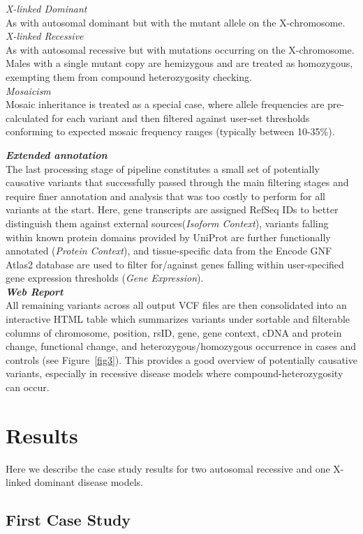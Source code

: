 \documentclass[twocolumn]{bmcart}%
\newcommand{\triplesub}[2]{\noindent\textsl{#1}\\#2\\}  %
\newcounter{changeCount}
\newcommand{\changes}[1]{
		\stepcounter{changeCount}
		{\tiny\bf\color{violet}\arabic{changeCount}}
		{\color{red} #1}
	}
\newcommand{\changes}[1]{#1}
\begin{document}
{{	\triplesub{X-linked Dominant}{As with autosomal dominant but with the mutant allele on the X-chromosome.}
	
	\triplesub{X-linked Recessive}{As with autosomal recessive but with mutations occurring on the X-chromosome. Males with a single mutant copy are hemizygous and are treated as homozygous, exempting them from compound heterozygosity checking.}
	
	\triplesub{Mosaicism}{Mosaic inheritance is treated as a special case, where allele frequencies are pre-calculated for each variant and then filtered against user-set thresholds conforming to expected mosaic frequency ranges (typically between 10-35\%).}
}

\changes{\triplesub{\bf Extended annotation}{The last processing stage of pipeline constitutes a small set of potentially causative variants that successfully passed through the main filtering stages and require finer annotation and analysis that was too costly to perform for all variants at the start. Here, gene transcripts are assigned RefSeq IDs to better distinguish them against external sources(\textit{Isoform Context}), variants falling within known protein domains provided by UniProt are further functionally annotated (\textit{Protein Context}), and tissue-specific data from the Encode GNF Atlas2 database are used to filter for/against genes falling within user-specified gene expression thresholds (\textit{Gene Expression}).}

\triplesub{\bf Web Report}{All remaining variants across all output VCF files are then consolidated into an interactive HTML table which summarizes variants under sortable and filterable columns of chromosome, position, rsID, gene, gene context, cDNA and protein change, functional change, and heterozygous/homozygous occurrence in cases and controls (see Figure~\ref{fig3}). This provides a good overview of potentially causative variants, especially in recessive disease models where compound-heterozygosity can occur.
}}
}

\section*{Results}

Here we describe the case study results for two autosomal recessive and one X-linked dominant disease models.

\subsection*{First Case Study}
\end{document}
